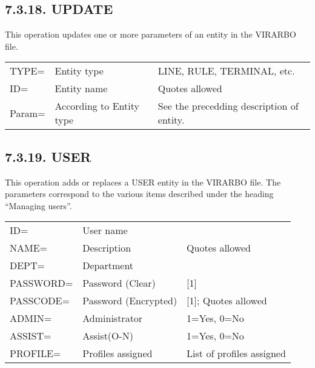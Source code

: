 \documentclass[letterpaper,10pt,english]{sphinxmanual}
\begin{document}
\subsection{7.3.18. UPDATE}
\label{\detokenize{Installation_Guide:update}}
This operation updates one or more parameters of an entity in the VIRARBO file.


\begin{savenotes}\sphinxattablestart
\centering
\begin{tabulary}{\linewidth}[t]{|T|T|T|}
\hline
{}\relax &\relax &\relax \\
\hline
TYPE=
&
Entity type
&
LINE, RULE, TERMINAL, etc.
\\
\hline
ID=
&
Entity name
&
Quotes allowed
\\
\hline
Param=
&
According to Entity type
&
See the precedding description of entity.
\\
\hline
\end{tabulary}
\par
\sphinxattableend\end{savenotes}


\subsection{7.3.19. USER}
\label{\detokenize{Installation_Guide:user}}
This operation adds or replaces a USER entity in the VIRARBO file. The parameters correspond to the various items described under the heading “Managing users”.


\begin{savenotes}\sphinxattablestart
\centering
\begin{tabulary}{\linewidth}[t]{|T|T|T|}
\hline
{}\relax &\relax &\relax \\
\hline
ID=
&
User name
&\\
\hline
NAME=
&
Description
&
Quotes allowed
\\
\hline
DEPT=
&
Department
&\\
\hline
PASSWORD=
&
Password (Clear)
&
{[}1{]}
\\
\hline
PASSCODE=
&
Password (Encrypted)
&
{[}1{]}; Quotes allowed
\\
\hline
ADMIN=
&
Administrator
&
1=Yes, 0=No
\\
\hline
ASSIST=
&
Assist(O-N)
&
1=Yes, 0=No
\\
\hline
PROFILE=
&
Profiles assigned
&
List of profiles assigned
\\
\hline
\end{tabulary}
\par
\sphinxattableend\end{savenotes}
\end{document}
